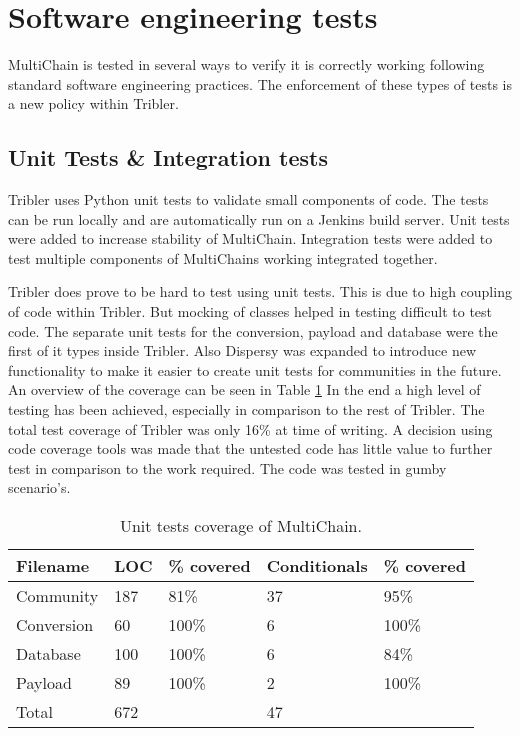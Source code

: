 \section{Software engineering tests}
MultiChain is tested in several ways to verify it is correctly working
following standard software engineering practices.
The enforcement of these types of tests is a new policy within Tribler.

\subsection{Unit Tests \& Integration tests}
Tribler uses Python unit tests to validate small components of code.
The tests can be run locally and
are automatically run on a Jenkins build server\cite{jenkins}\cite{jenkins-tribler}.
Unit tests were added to increase stability of MultiChain.
Integration tests were added to test multiple components of MultiChains working integrated together.

Tribler does prove to be hard to test using unit tests.
This is due to high coupling of code within Tribler.
But mocking of classes helped in testing difficult to test code.
The separate unit tests for the conversion, payload and database were the first of it types inside Tribler.
Also Dispersy was expanded to introduce new functionality to make it easier to create unit tests for communities in the future.
An overview of the coverage can be seen in Table \ref{tab:tests}
In the end a high level of testing has been achieved, especially in comparison to the rest of Tribler.
The total test coverage of Tribler was only 16\% at time of writing\cite{jenkins-tribler}.
A decision using code coverage tools was made that the untested code has little value to further test in comparison to the work required.
The code was tested in gumby scenario's.

\begin{table}
\centering
\begin{tabular}{l|ll|ll}
Filename   & LOC & \% covered   & Conditionals & \% covered    \\ \hline
Community  & 187 & 81\%         & 37           & 95\%  \\
Conversion & 60  & 100\%        & 6            & 100\%  \\
Database   & 100 & 100\%        & 6            & 84\%  \\
Payload    & 89  & 100\%        & 2            & 100\% \\ \hline
Total      & 672 &              & 47           &
\end{tabular}
\caption{Unit tests coverage of MultiChain.}
\label{tab:tests}
\end{table}

